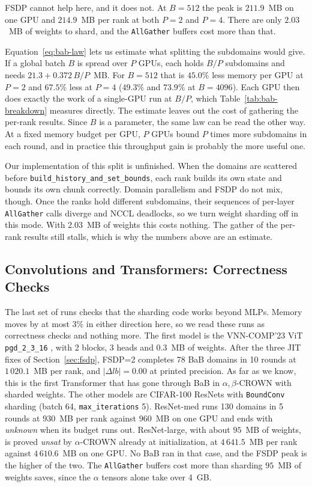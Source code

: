 \documentclass[runningheads]{llncs}
\begin{document}
FSDP cannot help here, and it does not. At $B{=}512$ the peak is $211.9$~MB on
one GPU and $214.9$~MB per rank at both $P{=}2$ and $P{=}4$. There are only
$2.03$~MB of weights to shard, and the \texttt{AllGather} buffers cost more
than that.

Equation~\ref{eq:bab-law} lets us estimate what splitting the subdomains would
give. If a global batch $B$ is spread over $P$ GPUs, each holds $B/P$
subdomains and needs $21.3 + 0.372\,B/P$~MB. For $B{=}512$ that is $45.0\%$
less memory per GPU at $P{=}2$ and $67.5\%$ less at $P{=}4$ ($49.3\%$ and
$73.9\%$ at $B{=}4096$). Each GPU then does exactly the work of a single-GPU
run at $B/P$, which Table~\ref{tab:bab-breakdown} measures directly. The
estimate leaves out the cost of gathering the per-rank results. Since $B$ is a
parameter, the same law can be read the other way. At a fixed memory budget per
GPU, $P$ GPUs bound $P$ times more subdomains in each round, and in practice
this throughput gain is probably the more useful one.

Our implementation of this split is unfinished. When the domains are scattered
before \texttt{build\_history\_and\_set\_bounds}, each rank builds its own state
and bounds its own chunk correctly. Domain parallelism and FSDP do not mix,
though. Once the ranks hold different subdomains, their sequences of per-layer
\texttt{AllGather} calls diverge and NCCL deadlocks, so we turn weight sharding
off in this mode. With $2.03$~MB of weights this costs nothing. The gather of
the per-rank results still stalls, which is why the numbers above are an
estimate.

\subsection{Convolutions and Transformers: Correctness Checks}
\label{sec:exp-arch}

The last set of runs checks that the sharding code works beyond MLPs. Memory
moves by at most 3\% in either direction here, so we read these runs as
correctness checks and nothing more. The first model is the VNN-COMP'23 ViT
\texttt{pgd\_2\_3\_16} \cite{arXiv2312VNNCOMP2023}, with 2 blocks, 3 heads and
$0.3$~MB of weights. After the three JIT fixes of Section~\ref{sec:fsdp},
FSDP=2 completes 78 BaB domains in 10 rounds at $1\,020.1$~MB per rank, and
$|\Delta lb| = 0.00$ at printed precision. As far as we know, this is the first
Transformer that has gone through BaB in $\alpha,\beta$-CROWN with sharded
weights. The other models are CIFAR-100 ResNets \cite{arXiv2412VNNCOMP2024}
with \texttt{BoundConv} sharding (batch 64, \texttt{max\_iterations} 5).
ResNet-med runs 130 domains in 5 rounds at $930$~MB per rank against $960$~MB
on one GPU and ends with \emph{unknown} when its budget runs out. ResNet-large,
with about $95$~MB of weights, is proved \emph{unsat} by $\alpha$-CROWN already
at initialization, at $4\,641.5$~MB per rank against $4\,610.6$~MB on one GPU.
No BaB ran in that case, and the FSDP peak is the higher of the two. The
\texttt{AllGather} buffers cost more than sharding $95$~MB of weights saves,
since the $\alpha$ tensors alone take over 4~GB.
\end{document}
